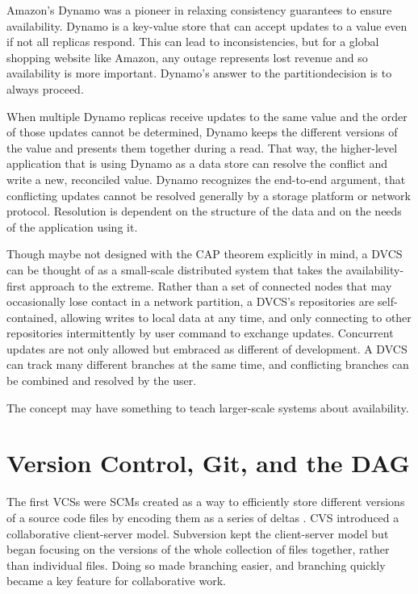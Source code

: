 Amazon's Dynamo\cite{dynamo} was a pioneer in relaxing consistency guarantees to
ensure availability. Dynamo is a key-value store that can accept updates to a
value even if not all replicas respond. This can lead to inconsistencies, but
for a global shopping website like Amazon, any outage represents lost revenue
and so availability is more important. Dynamo's answer to the
\gls{partitiondecision} is to always proceed.

When multiple Dynamo replicas receive updates to the same value and the order of
those updates cannot be determined, Dynamo keeps the different versions of the
value and presents them together during a read. That way, the higher-level
application that is using Dynamo as a data store can resolve the conflict and
write a new, reconciled value. Dynamo recognizes the end-to-end
argument\cite{endtoendargument}, that conflicting updates cannot be resolved
generally by a storage platform or network protocol. Resolution is dependent on
the structure of the data and on the needs of the application using it.

Though maybe not designed with the CAP theorem explicitly in mind, a \gls{DVCS}
can be thought of as a small-scale distributed system that takes the
availability-first approach to the extreme. Rather than a set of connected nodes
that may occasionally lose contact in a network partition, a \gls{DVCS}'s
repositories are self-contained, allowing writes to local data at any time, and
only connecting to other repositories intermittently by user command to exchange
updates. Concurrent updates are not only allowed but embraced as different
 of development. A \gls{DVCS} can track many different
branches at the same time, and conflicting branches can be combined and resolved
by the user.

The  concept may have something to
teach larger-scale systems about availability.

%



\section{Version Control, Git, and the DAG}


The first \glspl{VCS} were \glspl{SCM} created as a way to efficiently store
different versions of a source code files by encoding them as a series of deltas
\cite{history_of_version_control}. CVS introduced a collaborative client-server
model. Subversion kept the client-server model but began focusing
on the versions of the whole collection of files together, rather than
individual files. Doing so made branching easier, and branching
quickly became a key feature for collaborative work.

